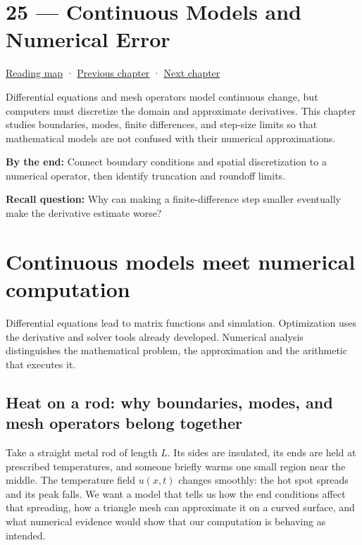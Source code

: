 \hypertarget{02-foundations-ii-ch025}{}
\chapter{25 --- Continuous Models and Numerical Error}\label{02-foundations-ii-ch025-continuous-models-and-numerical-error}

\hyperref[volume-reading-map]{Reading map} · \hyperref[02-foundations-ii-ch024]{Previous chapter} · \hyperref[02-foundations-ii-ch026]{Next chapter}

Differential equations and mesh operators model continuous change, but computers must discretize the domain and approximate derivatives. This chapter studies boundaries, modes, finite differences, and step-size limits so that mathematical models are not confused with their numerical approximations.

\textbf{By the end:} Connect boundary conditions and spatial discretization to a numerical operator, then identify truncation and roundoff limits.

\textbf{Recall question:} Why can making a finite-difference step smaller eventually make the derivative estimate worse?

\chapter{Continuous models meet numerical computation}\label{02-foundations-ii-ch025-continuous-models-meet-numerical-computation}

Differential equations lead to matrix functions and simulation. Optimization uses the derivative and solver tools already developed. Numerical analysis distinguishes the mathematical problem, the approximation and the arithmetic that executes it.

\section{Heat on a rod: why boundaries, modes, and mesh operators belong together}\label{02-foundations-ii-ch025-heat-on-a-rod-why-boundaries-modes-and-mesh-operators-belong-together}

Take a straight metal rod of length \(L\). Its sides are insulated, its ends are held at prescribed temperatures, and someone briefly warms one small region near the middle. The temperature field \(u(x,t)\) changes smoothly: the hot spot spreads and its peak falls. We want a model that tells us how the end conditions affect that spreading, how a triangle mesh can approximate it on a curved surface, and what numerical evidence would show that our computation is behaving as intended.

